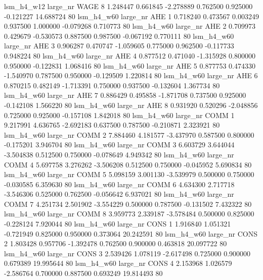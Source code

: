  lsm_h4_w12   large_nr     WAGE                 8  1.248447  0.661845  -2.278889 0.762500 0.925000 -0.121227   14.688724 80
  lsm_h4_w60   large_nr      AHE                 1  0.718240  0.473567   0.003249 0.937500 1.000000 -0.079268    0.710773 80
  lsm_h4_w60   large_nr      AHE                 2  0.709973  0.429679  -0.530573 0.887500 0.987500 -0.067192    0.770111 80
  lsm_h4_w60   large_nr      AHE                 3  0.906287  0.470747  -1.059605 0.775000 0.962500 -0.117733    0.948224 80
  lsm_h4_w60   large_nr      AHE                 4  0.877512  0.471040  -1.315928 0.800000 0.950000 -0.122831    1.068416 80
  lsm_h4_w60   large_nr      AHE                 5  0.877753  0.474330  -1.540970 0.787500 0.950000 -0.129509    1.220814 80
  lsm_h4_w60   large_nr      AHE                 6  0.870215  0.482149  -1.713391 0.750000 0.937500 -0.132604    1.367734 80
  lsm_h4_w60   large_nr      AHE                 7  0.886429  0.495858  -1.871708 0.737500 0.925000 -0.142108    1.566220 80
  lsm_h4_w60   large_nr      AHE                 8  0.931920  0.520296  -2.048856 0.725000 0.925000 -0.157108    1.842018 80
  lsm_h4_w60   large_nr     COMM                 1  9.217991  4.636765  -2.692183 0.637500 0.787500 -0.210871    2.323921 80
  lsm_h4_w60   large_nr     COMM                 2  7.884460  4.181577  -3.437970 0.587500 0.800000 -0.175201    3.946704 80
  lsm_h4_w60   large_nr     COMM                 3  6.603729  3.644044  -3.504838 0.512500 0.750000 -0.078649    4.949342 80
  lsm_h4_w60   large_nr     COMM                 4  5.697758  3.276262  -3.506208 0.512500 0.750000 -0.045952    5.690834 80
  lsm_h4_w60   large_nr     COMM                 5  5.098159  3.001130  -3.539979 0.500000 0.750000 -0.030585    6.359630 80
  lsm_h4_w60   large_nr     COMM                 6  4.634300  2.717718  -3.546306 0.525000 0.762500 -0.056642    6.937021 80
  lsm_h4_w60   large_nr     COMM                 7  4.251734  2.501902  -3.554229 0.500000 0.787500 -0.131502    7.432322 80
  lsm_h4_w60   large_nr     COMM                 8  3.959773  2.339187  -3.578484 0.500000 0.825000 -0.228124    7.920044 80
  lsm_h4_w60   large_nr     CONS                 1  1.916840  1.051321  -0.721949 0.825000 0.950000  0.373064   20.242591 80
  lsm_h4_w60   large_nr     CONS                 2  1.803428  0.957706  -1.392478 0.762500 0.900000  0.463818   20.097722 80
  lsm_h4_w60   large_nr     CONS                 3  2.539426  1.078119  -2.617498 0.725000 0.900000  0.679389   19.995644 80
  lsm_h4_w60   large_nr     CONS                 4  2.153968  1.026579  -2.586764 0.700000 0.887500  0.693249   19.814493 80
